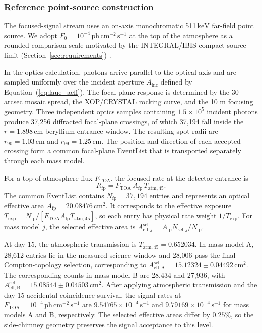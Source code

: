 \documentclass[11pt]{article}
\newcommand{\keV}{\ensuremath{\,\mathrm{keV}}}
\newcommand{\phcms}{\ensuremath{\,\mathrm{ph\,cm^{-2}\,s^{-1}}}}
\newcommand{\cps}{\ensuremath{\,\mathrm{s^{-1}}}}
\newcommand{\fzero}{F_{0}}
\begin{document}
\subsubsection{Reference point-source construction}
\label{subsec:pointsource}

The focused-signal stream uses an on-axis monochromatic 511\keV{} far-field
point source. We adopt $\fzero=10^{-4}\phcms$ at the top of the atmosphere as a
rounded comparison scale motivated by the INTEGRAL/IBIS compact-source limit
(Section~\ref{sec:requirements}) \cite{DeCesare2011}.

In the optics calculation, photons arrive parallel to the optical axis and are
sampled uniformly over the incident aperture $A_{\mathrm{inc}}$ defined by
Equation~(\ref{eq:laue_aeff}). The focal-plane response is determined by the
30 arcsec mosaic spread, the XOP/CRYSTAL rocking curve, and the 10 m focusing
geometry. Three independent optics samples containing $1.5\times10^5$ incident
photons produce 37,256 diffracted focal-plane crossings, of which 37,194 fall
inside the $r=1.898\,\mathrm{cm}$ beryllium entrance window. The resulting spot
radii are $r_{90}=1.03\,\mathrm{cm}$ and $r_{99}=1.25\,\mathrm{cm}$. The position
and direction of each accepted crossing form a common focal-plane EventList that
is transported separately through each mass model.

For a top-of-atmosphere flux $F_{\mathrm{TOA}}$, the focused rate at the detector
entrance is
\begin{equation}
  R_{\mathrm{fp}}=F_{\mathrm{TOA}}\,A_{\mathrm{fp}}\,T_{\mathrm{atm},45}.
\end{equation}
The common EventList contains $N_{\mathrm{fp}}=37{,}194$ entries and represents
an optical effective area $A_{\mathrm{fp}}=20.08476\,\mathrm{cm^2}$. It
corresponds to the effective exposure
$T_{\mathrm{exp}}=N_{\mathrm{fp}}/[F_{\mathrm{TOA}}A_{\mathrm{fp}}
T_{\mathrm{atm},45}]$, so each entry has physical rate weight
$1/T_{\mathrm{exp}}$. For mass model $j$, the selected effective area is
$A_{\mathrm{eff},j}^{\mathrm{sel}}=A_{\mathrm{fp}}N_{\mathrm{sel},j}/N_{\mathrm{fp}}$.

At day 15, the atmospheric transmission is $T_{\mathrm{atm},45}=0.652034$. In
mass model A, 28,612 entries lie in the measured science window and 28,006 pass
the final Compton-topology selection, corresponding to
$A_{\mathrm{eff,A}}^{\mathrm{sel}}=15.12324\pm0.04492\,\mathrm{cm^2}$. The
corresponding counts in mass model B are 28,434 and 27,936, with
$A_{\mathrm{eff,B}}^{\mathrm{sel}}=15.08544\pm0.04503\,\mathrm{cm^2}$. After applying atmospheric
transmission and the day-15 accidental-coincidence survival, the signal rates at
$F_{\mathrm{TOA}}=10^{-4}\phcms$ are $9.54765\times10^{-4}\cps$ and
$9.79169\times10^{-4}\cps$ for mass models A and B, respectively. The selected
effective areas differ by $0.25\%$, so the side-chimney geometry preserves the
signal acceptance to this level.
\end{document}
